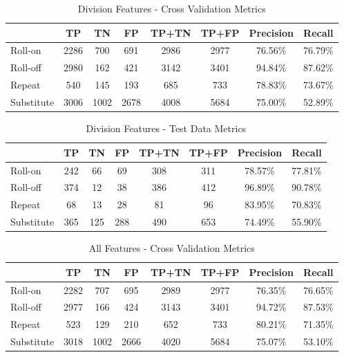 \documentclass[letterpaper, 10 pt, conference]{ieeeconf}  %
\begin{document}
\begin{table}[h]
\begin{center}
\begin{tabular}{|l|c|c|c|c|c|c|c|} \hline
& TP & TN & FP & TP+TN & TP+FP & Precision & Recall \\ \hline
Roll-on & 2286 & 700 & 691 & 2986 & 2977 & 76.56\% & 76.79\% \\ \hline
Roll-off & 2980 & 162 & 421 & 3142 & 3401 & 94.84\% & 87.62\% \\ \hline
Repeat & 540 & 145 & 193 & 685 & 733 & 78.83\% & 73.67\% \\ \hline
Substitute & 3006 & 1002 & 2678 & 4008 & 5684 & 75.00\% & 52.89\% \\ \hline
\end{tabular}
\caption{Division Features - Cross Validation Metrics}
\label{table:divisioncvm}
\end{center}
\end{table}

\begin{table}[h]
\begin{center}
\begin{tabular}{|l|c|c|c|c|c|c|c|} \hline
& TP & TN & FP & TP+TN & TP+FP & Precision & Recall \\ \hline
Roll-on & 242 & 66 & 69 & 308 & 311 & 78.57\% & 77.81\% \\ \hline
Roll-off & 374 & 12 & 38 & 386 & 412 & 96.89\% & 90.78\% \\ \hline
Repeat & 68 & 13 & 28 & 81 & 96 & 83.95\% & 70.83\% \\ \hline
Substitute & 365 & 125 & 288 & 490 & 653 & 74.49\% & 55.90\% \\ \hline
\end{tabular}
\caption{Division Features - Test Data Metrics}
\label{table:divisiontdm}
\end{center}
\end{table}

\begin{table}[h]
\begin{center}
\begin{tabular}{|l|c|c|c|c|c|c|c|} \hline
& TP & TN & FP & TP+TN & TP+FP & Precision & Recall \\ \hline
Roll-on & 2282 & 707 & 695 & 2989 & 2977 & 76.35\% & 76.65\% \\ \hline
Roll-off & 2977 & 166 & 424 & 3143 & 3401 & 94.72\% & 87.53\% \\ \hline
Repeat & 523 & 129 & 210 & 652 & 733 & 80.21\% & 71.35\% \\ \hline
Substitute & 3018 & 1002 & 2666 & 4020 & 5684 & 75.07\% & 53.10\% \\ \hline
\end{tabular}
\caption{All Features - Cross Validation Metrics}
\label{table:allcvm}
\end{center}
\end{table}
\end{document}
